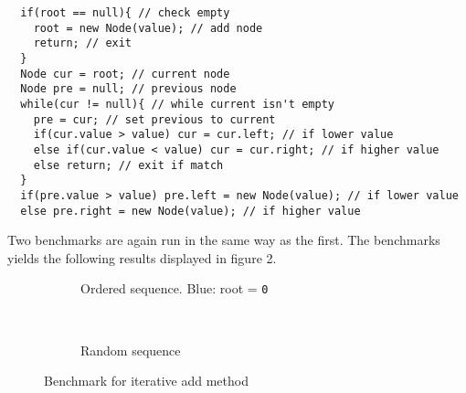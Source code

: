 \documentclass[a4paper,11pt]{article}
\begin{document}
\begin{verbatim}
  if(root == null){ // check empty
    root = new Node(value); // add node
    return; // exit
  }
  Node cur = root; // current node
  Node pre = null; // previous node
  while(cur != null){ // while current isn't empty
    pre = cur; // set previous to current
    if(cur.value > value) cur = cur.left; // if lower value
    else if(cur.value < value) cur = cur.right; // if higher value
    else return; // exit if match
  }
  if(pre.value > value) pre.left = new Node(value); // if lower value
  else pre.right = new Node(value); // if higher value
\end{verbatim}

Two benchmarks are again run in the same way as the first. The 
benchmarks yields the following results displayed in figure 2.

\begin{figure*}[ht!]
  \centering
  \begin{subfigure}[t]{0.47\textwidth}
    \caption{Ordered sequence. Blue: root = {\tt 0}}
    \label{fig:subplot3}
  \end{subfigure}
  ~
  \begin{subfigure}[t]{0.5\textwidth}
    \caption{Random sequence}
    \label{fig:subplot4}
  \end{subfigure}
  \caption{Benchmark for iterative add method}
  \label{fig:plot2}
\end{figure*}
\end{document}
